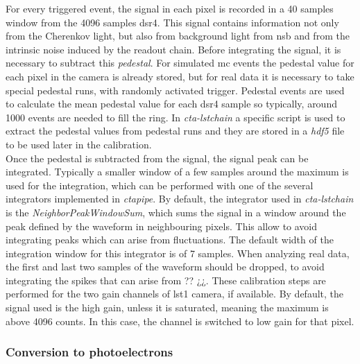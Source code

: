 \documentclass[main.tex]{subfiles}
\begin{document}
For every triggered event, the signal in each pixel is recorded in a 40 samples window from the 4096 samples \gls{dsr4}. This signal contains information not only from the Cherenkov light, but also from background light from \gls{nsb} and from the intrinsic noise induced by the readout chain. Before integrating the signal, it is necessary to subtract this \textit{pedestal}. For simulated \gls{mc} events the pedestal value for each pixel in the camera is already stored, but for real data it is necessary to take special pedestal runs, with randomly activated trigger. Pedestal events are used to calculate the mean pedestal value for each \gls{dsr4} sample so typically, around 1000 events are needed to fill the ring. In \textit{cta-lstchain} a specific script is used to extract the pedestal values from pedestal runs and they are stored in a \textit{hdf5} file to be used later in the calibration.\\
Once the pedestal is subtracted from the signal, the signal peak can be integrated. Typically a smaller window of a few samples around the maximum is used for the integration, which can be performed with one of the several integrators implemented in \textit{ctapipe}. By default, the integrator used in \textit{cta-lstchain} is the \textit{NeighborPeakWindowSum}, which sums the signal in a window around the peak defined by the waveform in neighbouring pixels. This allow to avoid integrating peaks which can arise from fluctuations. The default width of the integration window for this integrator is of 7 samples. When analyzing real data, the first and last two samples of the waveform should be dropped, to avoid integrating the spikes that can arise from ?? ¿¿. These calibration steps are performed for the two gain channels of \gls{lst}1 camera, if available. By default, the signal used is the high gain, unless it is saturated, meaning the maximum is above 4096 counts. In this case, the channel is switched to low gain for that pixel. 

\subsubsection{Conversion to photoelectrons}
\end{document}
